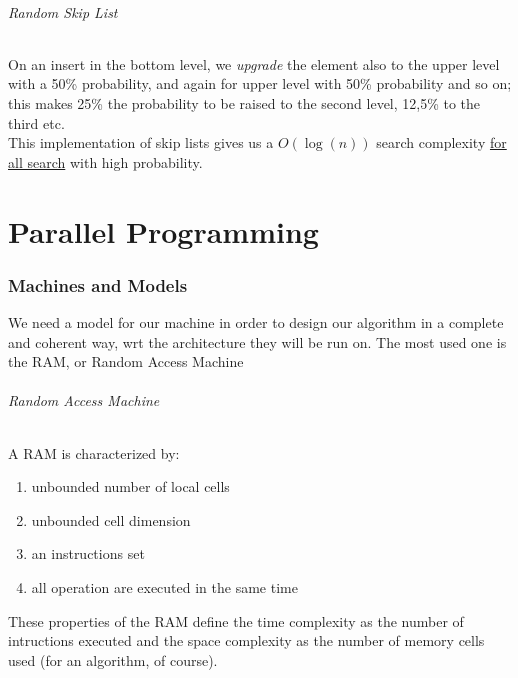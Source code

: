 \documentclass{article}
\begin{document}
				\paragraph{Random Skip List}
					On an insert in the bottom level, we \textit{upgrade} the element also to the upper level with a 50\% probability, and again for upper level with 50\% probability and so on; this makes 25\% the probability to be raised to the second level, 12,5\% to the third etc.\\
					This implementation of skip lists gives us a $O(\log(n))$ search complexity \underline{for all search} with high probability.

	\clearpage
	\part{Parallel Programming}
	\section{Machines and Models}
		We need a model for our machine in order to design our algorithm in a complete and coherent way, wrt the architecture they will be run on. The most used one is the RAM, or Random Access Machine

		\paragraph{Random Access Machine}
			A RAM is characterized by:
			\begin{enumerate}
				\item unbounded number of local cells
				\item unbounded cell dimension
				\item an instructions set
				\item all operation are executed in the same time
			\end{enumerate}
			These properties of the RAM define the time complexity as the number of intructions executed and the space complexity as the number of memory cells used (for an algorithm, of course).
\end{document}
